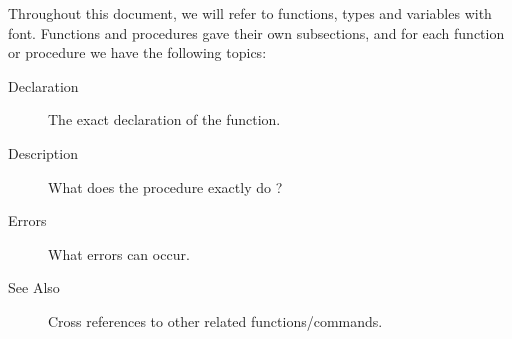 Throughout this document, we will refer to functions, types and variables
with  font. Functions and procedures gave their own
subsections, and for each function or procedure we have the following
topics:
\begin{description}
\item [Declaration] The exact declaration of the function.
\item [Description] What does the procedure exactly do ?
\item [Errors] What errors can occur.
\item [See Also] Cross references to other related functions/commands.
\end{description}



